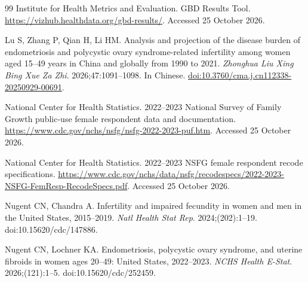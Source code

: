 \documentclass[11pt,a4paper]{article}
\begin{document}
{\begin{thebibliography}{99}
 Institute for Health Metrics and Evaluation. GBD Results Tool. \url{https://vizhub.healthdata.org/gbd-results/}. Accessed 25 October 2026.

 Lu S, Zhang P, Qian H, Li HM. Analysis and projection of the disease burden of endometriosis and polycystic ovary syndrome-related infertility among women aged 15--49 years in China and globally from 1990 to 2021. \emph{Zhonghua Liu Xing Bing Xue Za Zhi}. 2026;47:1091--1098. In Chinese. \href{https://doi.org/10.3760/cma.j.cn112338-20250929-00691}{doi:10.3760/cma.j.cn112338-20250929-00691}.

 National Center for Health Statistics. 2022--2023 National Survey of Family Growth public-use female respondent data and documentation. \url{https://www.cdc.gov/nchs/nsfg/nsfg-2022-2023-puf.htm}. Accessed 25 October 2026.

 National Center for Health Statistics. 2022--2023 NSFG female respondent recode specifications. \url{https://www.cdc.gov/nchs/data/nsfg/recodespecs/2022-2023-NSFG-FemResp-RecodeSpecs.pdf}. Accessed 25 October 2026.

 Nugent CN, Chandra A. Infertility and impaired fecundity in women and men in the United States, 2015--2019. \emph{Natl Health Stat Rep}. 2024;(202):1--19. doi:10.15620/cdc/147886.

 Nugent CN, Lochner KA. Endometriosis, polycystic ovary syndrome, and uterine fibroids in women ages 20--49: United States, 2022--2023. \emph{NCHS Health E-Stat}. 2026;(121):1--5. doi:10.15620/cdc/252459.


\end{thebibliography}}
\end{document}
